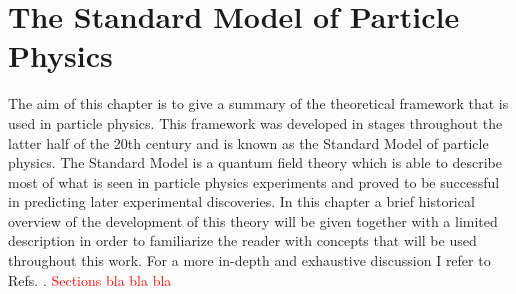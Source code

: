 
\chapter{The Standard Model of Particle Physics}
The aim of this chapter is to give a summary of the theoretical framework that is used in particle physics.
This framework was developed in stages throughout the latter half of the 20th century and is known as the Standard Model of particle physics.
The Standard Model is a quantum field theory which is able to describe most of what is seen in particle physics experiments and proved to be successful in predicting later experimental discoveries.
In this chapter a brief historical overview of the development of this theory will be given together with a limited description in order to familiarize the reader with concepts that will be used throughout this work.
For a more in-depth and exhaustive discussion I refer to Refs. \cite{Povh,Peskin:1995ev,Agashe:2014kda,Bettini:2008zz}. \textcolor{red}{Sections bla bla bla}

